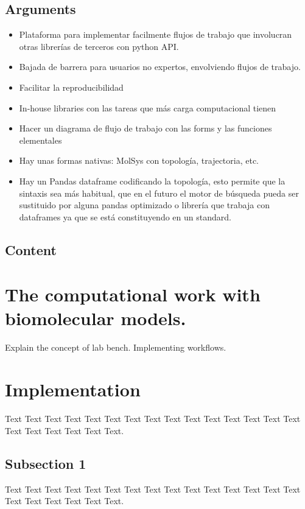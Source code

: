 \documentclass{bioinfo}
\begin{document}
\subsection{Arguments}
\begin{itemize}
\item Plataforma para implementar facilmente flujos de trabajo que involucran otras librerías de 
	terceros con python API.
\item Bajada de barrera para usuarios no expertos, envolviendo flujos de trabajo.
\item Facilitar la reproducibilidad
\item In-house libraries con las tareas que más carga computacional tienen
\item Hacer un diagrama de flujo de trabajo con las forms y las funciones elementales
\item Hay unas formas nativas: MolSys con topología, trajectoria, etc.
\item Hay un Pandas dataframe codificando la topología, esto permite que la sintaxis sea más
	habitual, que en el futuro el motor de búsqueda pueda ser sustituido por alguna pandas
		optimizado o librería que trabaja con dataframes ya que se está constituyendo en un
		standard.
\end{itemize}

\subsection{Content}


\section{The computational work with biomolecular models.}

Explain the concept of lab bench.
Implementing workflows.

\section{Implementation}

Text Text Text Text Text Text Text Text
Text Text Text Text Text Text Text Text Text Text Text Text Text.


\subsection{Subsection 1}

Text Text Text Text Text Text  Text Text Text Text Text Text Text
Text Text  Text Text Text Text Text Text.
\end{document}
